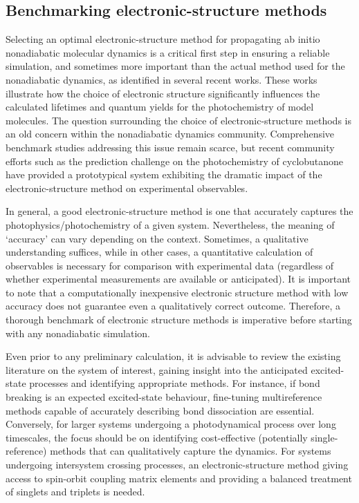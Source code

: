 \documentclass[9pt,bestpractices]{livecoms}
\begin{document}
\subsection{Benchmarking electronic-structure methods}
\label{sec:banchmarkelstr}
Selecting an optimal electronic-structure method for propagating ab initio nonadiabatic molecular dynamics is a critical first step in ensuring a reliable simulation, and sometimes more important than the actual method used for the nonadiabatic dynamics, as identified in several recent works.\cite{janos2023controls,papineau2024,tomas2024,crespo2018recent} These works illustrate how the choice of electronic structure significantly influences the calculated lifetimes and quantum yields for the photochemistry of model molecules. The question surrounding the choice of electronic-structure methods is an old concern within the nonadiabatic dynamics community. Comprehensive benchmark studies addressing this issue remain scarce, but recent community efforts such as the prediction challenge on the photochemistry of cyclobutanone have provided a prototypical system exhibiting the dramatic impact of the electronic-structure method on experimental observables.\cite{predictionchallenge}

In general, a good electronic-structure method is one that accurately captures the photophysics/photochemistry of a given system. Nevertheless, the meaning of `accuracy' can vary depending on the context. Sometimes, a qualitative understanding suffices, while in other cases, a quantitative calculation of observables is necessary for comparison with experimental data (regardless of whether experimental measurements are available or anticipated). It is important to note that a computationally inexpensive electronic structure method with low accuracy does not guarantee even a qualitatively correct outcome. Therefore, a thorough benchmark of electronic structure methods is imperative before starting with any nonadiabatic simulation.

Even prior to any preliminary calculation, it is advisable to review the existing literature on the system of interest, gaining insight into the anticipated excited-state processes and identifying appropriate methods. For instance, if bond breaking is an expected excited-state behaviour, fine-tuning multireference methods capable of accurately describing bond dissociation are essential. Conversely, for larger systems undergoing a photodynamical process over long timescales, the focus should be on identifying cost-effective (potentially single-reference) methods that can qualitatively capture the dynamics. For systems undergoing intersystem crossing processes, an electronic-structure method giving access to spin-orbit coupling matrix elements and providing a balanced treatment of singlets and triplets is needed.
\end{document}
